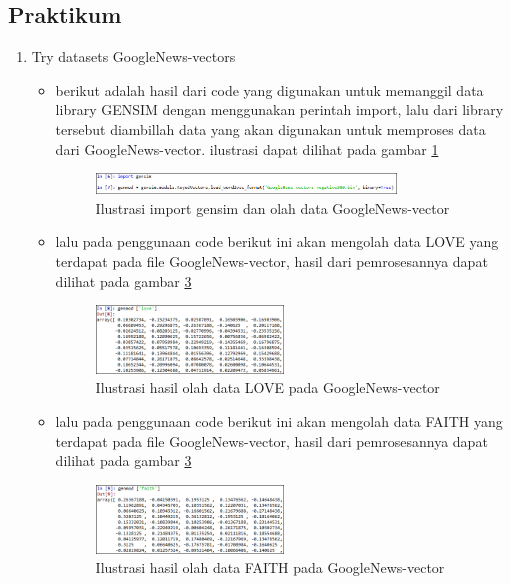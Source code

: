\subsection{Praktikum}
\begin{enumerate}
\item Try datasets GoogleNews-vectors
\begin{itemize}
\item berikut adalah hasil dari code yang digunakan untuk memanggil data library GENSIM dengan menggunakan perintah import, lalu dari library tersebut diambillah data yang akan digunakan untuk memproses data dari GoogleNews-vector. ilustrasi dapat dilihat pada gambar \ref{fig7}
\begin{figure}[!htbp]
	\centering
	\includegraphics[width=0.8\textwidth]{figures/fathi/chapter5/hari2/1}
	\caption{Ilustrasi  import gensim dan olah data GoogleNews-vector}
	\label{fig7}
\end{figure}

\item lalu pada penggunaan code berikut ini akan mengolah data LOVE yang terdapat pada file GoogleNews-vector, hasil dari pemrosesannya dapat dilihat pada gambar \ref{fig8}
\begin{figure}[!htbp]
	\centering
	\includegraphics[width=0.5\textwidth]{figures/fathi/chapter5/hari2/2}
	\caption{Ilustrasi hasil olah data LOVE pada GoogleNews-vector}
	\label{fig8}
\end{figure}

\item  lalu pada penggunaan code berikut ini akan mengolah data FAITH yang terdapat pada file GoogleNews-vector, hasil dari pemrosesannya dapat dilihat pada gambar \ref{fig8}
\begin{figure}[!htbp]
	\centering
	\includegraphics[width=0.5\textwidth]{figures/fathi/chapter5/hari2/3}
	\caption{Ilustrasi hasil olah data FAITH pada GoogleNews-vector}
	\label{fig8}
\end{figure}


\end{itemize}
\end{enumerate}

